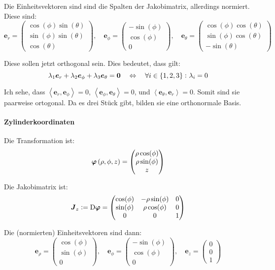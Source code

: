 \documentclass[11pt, ngerman]{article}
\newcommand{\inner}[2]{\left\langle #1, #2 \right\rangle}
\newcommand{\tens}[1]{\boldsymbol{#1}}
\renewcommand{\vec}[1]{\boldsymbol{#1}}
\begin{document}
Die Einheitsvektoren sind sind die Spalten der Jakobimatrix, allerdings normiert. Diese sind:
\[
	\vec e_r = \begin{pmatrix}
		\cos(\phi) \sin(\theta) \\
		\sin(\phi) \sin(\theta) \\
		\cos(\theta)
	\end{pmatrix}
	, \quad
	\vec e_\phi = \begin{pmatrix}
		-\sin(\phi) \\
		\cos(\phi) \\
		0
	\end{pmatrix}
	, \quad
	\vec e_\theta = \begin{pmatrix}
		\cos(\phi) \cos(\theta) \\
		\sin(\phi) \cos(\theta) \\
		-\sin(\theta)
	\end{pmatrix}
\]

Diese sollen jetzt orthogonal sein. Dies bedeutet, dass gilt:
\[
	\lambda_1 \vec e_r + \lambda_2 \vec e_\phi + \lambda_3 \vec e_\theta = \vec 0
	\quad \Leftrightarrow \quad
	\forall i \in \set{1, 2, 3}\colon \lambda_i = 0
\]

Ich sehe, dass $\inner{\vec e_r}{\vec e_\phi} = 0$, $\inner{\vec e_\phi}{\vec e_\theta} = 0$, und $\inner{\vec e_\theta}{\vec e_r} = 0$. Somit sind sie paarweise ortogonal. Da es drei Stück gibt, bilden sie eine orthonormale Basis.

\paragraph{Zylinderkoordinaten}

Die Transformation ist:
\[
	\vec\varphi\del{\rho, \phi, z} = \begin{pmatrix}
		\rho \cos(\phi) \\
		\rho \sin(\phi) \\
		z
	\end{pmatrix}
\]

Die Jakobimatrix ist:
\[
	\tens J_z := \Dif \vec\varphi = \begin{pmatrix}
		\cos(\phi) & - \rho \sin(\phi) & 0 \\
		\sin(\phi) & \rho \cos(\phi) & 0 \\
						  0 & 0 & 1
	\end{pmatrix}
\]

Die (normierten) Einheitsvektoren sind dann:
\[
	\vec e_\rho = \begin{pmatrix}
		\cos(\phi) \\
		\sin(\phi) \\
		0
	\end{pmatrix}
	, \quad
	\vec e_\phi = \begin{pmatrix}
		-\sin(\phi) \\
		\cos(\phi) \\
		0
	\end{pmatrix}
	, \quad
	\vec e_z = \begin{pmatrix}
		0 \\
		0 \\
		1
	\end{pmatrix}
\]
\end{document}
